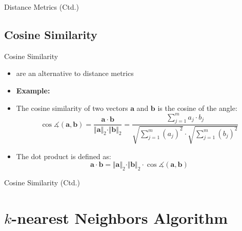 \begin{frame}{Distance Metrics (Ctd.)}{}
	
\end{frame}


\subsection{Cosine Similarity}

\begin{frame}{Cosine Similarity}{}
	\begin{itemize}
		\item {} are an alternative to distance metrics
		\item \textbf{Example:} 
		\item The cosine similarity of two vectors $\bm{a}$ and $\bm{b}$ is the cosine of the angle:
		\begin{equation}
			\cos \measuredangle (\bm{a}, \bm{b}) = \frac{\bm{a} \cdot \bm{b}}{\Vert \bm{a} \Vert_2 \cdot \Vert \bm{b} \Vert_2}
				= \frac{\sum_{j=1}^m a_j \cdot b_j}{\sqrt{\sum_{j=1}^m (a_j)^2} \cdot \sqrt{\sum_{j=1}^m (b_j)^2}}
		\end{equation}
		\item The dot product is defined as:
		\begin{equation}
			\bm{a} \cdot \bm{b} = \Vert \bm{a} \Vert_2 \cdot \Vert \bm{b} \Vert_2 \cdot \cos \measuredangle (\bm{a}, \bm{b})
		\end{equation}
	\end{itemize}
\end{frame}


\begin{frame}{Cosine Similarity (Ctd.)}{}
	
\end{frame}


\section{$k$-nearest Neighbors Algorithm}

